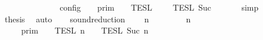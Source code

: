 \begin{isabellebody}
\ \ \ \ \isamarkupfalse%
\ \isamarkupfalse%
\ {\isacartoucheopen}{\isasymlbrakk}\ {\isacharbrackleft}{\isacharbrackright}{\isacharcomma}\ {}\ {\isasymturnstile}\ {\isasymPsi}\ {\isasymtriangleright}\ {\isacharbrackleft}{\isacharbrackright}\ {\isasymrbrakk}\isactrlsub c\isactrlsub o\isactrlsub n\isactrlsub f\isactrlsub i\isactrlsub g\ {\isacharequal}\ {\isasymlbrakk}{\isasymlbrakk}\ {\isacharbrackleft}{\isacharbrackright}\ {\isasymrbrakk}{\isasymrbrakk}\isactrlsub p\isactrlsub r\isactrlsub i\isactrlsub m\ {\isasyminter}\ {\isasymlbrakk}{\isasymlbrakk}\ {\isasymPsi}\ {\isasymrbrakk}{\isasymrbrakk}\isactrlsub T\isactrlsub E\isactrlsub S\isactrlsub L\isactrlbsup {\isasymge}\ {}\isactrlesup \ {\isasyminter}\ {\isasymlbrakk}{\isasymlbrakk}\ {\isacharbrackleft}{\isacharbrackright}\ {\isasymrbrakk}{\isasymrbrakk}\isactrlsub T\isactrlsub E\isactrlsub S\isactrlsub L\isactrlbsup {\isasymge}\ Suc\ {}\isactrlesup {\isacartoucheclose}\isanewline
\ \ \ \ \isamarkupfalse%
\ simp\isanewline
\ \ \ \ \isamarkupfalse%
\ \isamarkupfalse%
\ {\isacharquery}thesis\ \isamarkupfalse%
\ auto\isanewline
\ \ \isamarkupfalse%
%
\endisatagproof
{\isafoldproof}%
%
\isadelimproof
%
\endisadelimproof
%
\isadelimdocument
%
\endisadelimdocument
%
\isatagdocument
%
\isamarkuptrue%
%
\endisatagdocument
{\isafolddocument}%
%
\isadelimdocument
%
\endisadelimdocument
{}\isamarkupfalse%
\ sound{\isacharunderscore}reduction{\isacharcolon}\isanewline
\ \ \ {\isacartoucheopen}{\isacharparenleft}{\isasymGamma}\ n\ {\isasymturnstile}\ {\isasymPsi}\ {\isasymtriangleright}\ {\isasymPhi}\ \ {\isasymhookrightarrow}\ \ {\isacharparenleft}{\isasymGamma}\ n\ {\isasymturnstile}\ {\isasymPsi}\ {\isasymtriangleright}\ {\isasymPhi}\isanewline
\ \ \ {\isacartoucheopen}{\isasymlbrakk}{\isasymlbrakk}\ {\isasymGamma}\ {\isasymrbrakk}{\isasymrbrakk}\isactrlsub p\isactrlsub r\isactrlsub i\isactrlsub m\ {\isasyminter}\ {\isasymlbrakk}{\isasymlbrakk}\ {\isasymPsi}\ {\isasymrbrakk}{\isasymrbrakk}\isactrlsub T\isactrlsub E\isactrlsub S\isactrlsub L\isactrlbsup {\isasymge}\ n\isactrlesup \ {\isasyminter}\ {\isasymlbrakk}{\isasymlbrakk}\ {\isasymPhi}\ {\isasymrbrakk}{\isasymrbrakk}\isactrlsub T\isactrlsub E\isactrlsub S\isactrlsub L\isactrlbsup {\isasymge}\ Suc\ n\isactrlesup \isanewline

\end{isabellebody}
